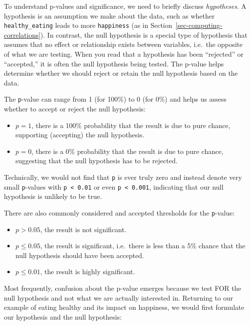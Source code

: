 \documentclass[
  letterpaper,
]{krantz}
\begin{document}
To understand p-values and significance, we need to briefly discuss
\emph{hypotheses}. A hypothesis is an assumption we make about the data,
such as whether \texttt{healthy\_eating} leads to more
\texttt{happiness} (as in Section~\ref{sec-computing-correlations}). In
contrast, the null hypothesis is a special type of hypothesis that
assumes that no effect or relationship exists between variables,
i.e.~the opposite of what we are testing. When you read that a
hypothesis has been ``rejected'' or ``accepted,'' it is often the null
hypothesis being tested. The p-value helps determine whether we should
reject or retain the null hypothesis based on the data.

The \texttt{p}-value can range from 1 (for 100\%) to 0 (for 0\%) and
helps us assess whether to accept or reject the null hypothesis:

\begin{itemize}
\item
  \(p = 1\), there is a 100\% probability that the result is due to pure
  chance, supporting (accepting) the null hypothesis.
\item
  \(p = 0\), there is a 0\% probability that the result is due to pure
  chance, suggesting that the null hypothesis has to be rejected.
\end{itemize}

Technically, we would not find that \texttt{p} is ever truly zero and
instead denote very small \texttt{p}-values with
\texttt{p\ \textless{}\ 0.01} or even \texttt{p\ \textless{}\ 0.001},
indicating that our null hypothesis is unlikely to be true.

There are also commonly considered and accepted thresholds for the
\texttt{p}-value:

\begin{itemize}
\item
  \(p > 0.05\), the result is not significant.
\item
  \(p \leq 0.05\), the result is significant, i.e.~there is less than a
  5\% chance that the null hypothesis should have been accepted.
\item
  \(p \leq 0.01\), the result is highly significant.
\end{itemize}

Most frequently, confusion about the p-value emerges because we test FOR
the null hypothesis and not what we are actually interested in.
Returning to our example of eating healthy and its impact on happiness,
we would first formulate our hypothesis and the null hypothesis:
\end{document}

